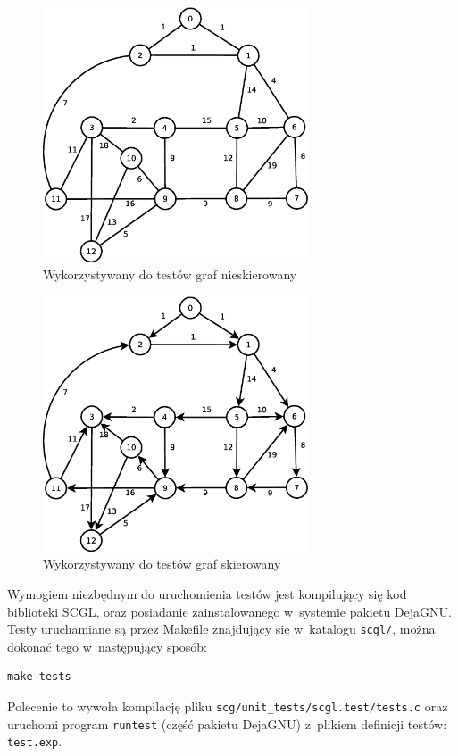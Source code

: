 \documentclass[a4paper,12pt,polish,twoside,openright]{thesis}
\newcommand\code[1]{\lstinline[style=line]{#1}}
\begin{document}
\begin{figure}[htb]
	\begin{center}
		\includegraphics[width=0.7\textwidth]{gfx/test_graph_undirected.eps}
		\caption{Wykorzystywany do testów graf nieskierowany}
		\label{fig:test_undirected}
	\end{center}
\end{figure}
\clearpage
\begin{figure}[htb]
	\begin{center}
		\includegraphics[width=0.7\textwidth]{gfx/test_graph_directed.eps}
		\caption{Wykorzystywany do testów graf skierowany}
		\label{fig:test_directed}
	\end{center}
\end{figure}

Wymogiem niezbędnym do uruchomienia testów jest kompilujący się kod biblioteki SCGL, oraz posiadanie zainstalowanego w~systemie pakietu DejaGNU.
Testy uruchamiane są przez Makefile znajdujący się w~katalogu \code{scgl/}, można dokonać tego w~następujący sposób:
\begin{lstlisting}[style=coden]
make tests
\end{lstlisting}
Polecenie to wywoła kompilację pliku \code{scg/unit_tests/scgl.test/tests.c} oraz uruchomi program \code{runtest} (część pakietu DejaGNU) z~plikiem definicji testów: \code{test.exp}.
\end{document}
